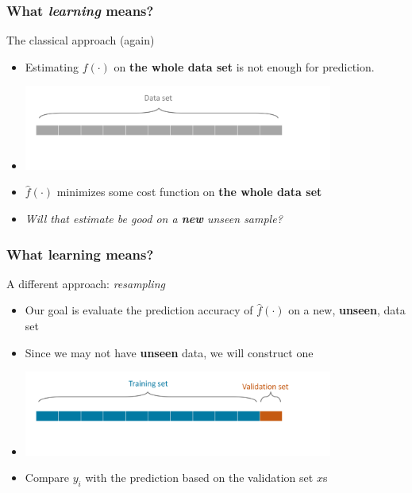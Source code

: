 \documentclass[xcolor=x11names,compress, aspectratio=169]{beamer}
\renewcommand{\(}{\begin{columns}}
\renewcommand{\)}{\end{columns}}
\newcommand{\<}[1]{\begin{column}{#1}}
\renewcommand{\>}{\end{column}}
\begin{document}
\begin{frame}
\frametitle{\textcolor{brique}{ What \emph{learning} means?}}
The classical approach (again)
\begin{itemize}
\item Estimating $f(\cdot)$ on \textbf{the whole data set} is not enough for prediction.
\item[] \includegraphics[width = 0.8\textwidth]{ML-Sets1.png}
\item  $\widehat f(\cdot)$  minimizes some cost function on \textbf{the whole data set}
\item \emph{Will that estimate be good on a \textcolor[rgb]{1.00,0.00,0.00}{\textbf{new }} \emph{unseen} sample?}
\end{itemize}
\end{frame}


\begin{frame}
\frametitle{\textcolor{brique}{ What learning means?}}
A different approach: \textit{resampling}
\begin{itemize}[<+->]
\item Our goal is  evaluate the prediction accuracy of $\widehat f(\cdot)$ on a new, \textbf{unseen}, data set
\item Since we may not have \textbf{unseen} data, we will construct one
\item[] \includegraphics[width = 0.8\textwidth]{ML-Sets4.png}
\item Compare $y_i$  with the prediction based on the validation set $x$s
\end{itemize}
\end{frame}
\end{document}
